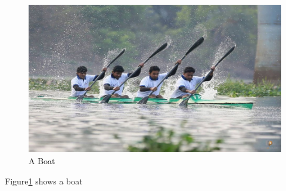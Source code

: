 \documentclass{article}
\begin{document}
\begin{figure}
\includegraphics[width=\linewidth]{boat.jpg}
\caption{A Boat}
\label{fig 1: boat}
\end{figure}
Figure\ref{fig 1: boat} shows a boat
\end{document}
